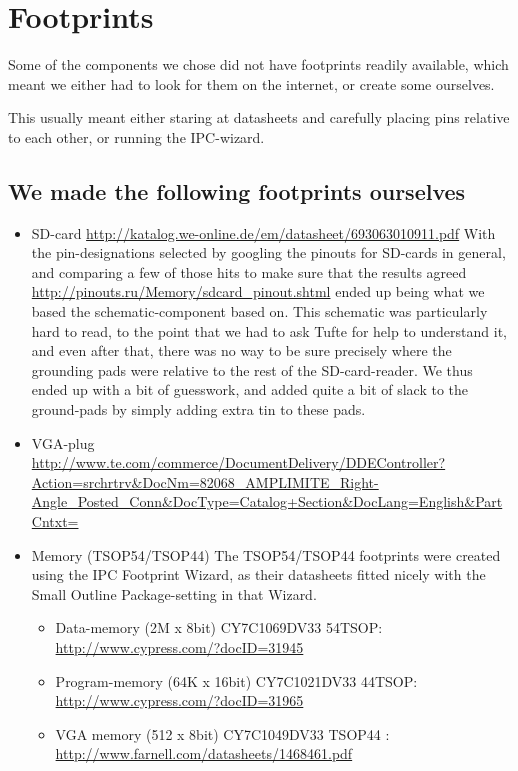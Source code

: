 \section {Footprints}
Some of the components we chose did not have footprints readily available, which
meant we either had to look for them on the internet, or create some ourselves.

This usually meant either staring at datasheets and carefully placing pins
relative to each other, or running the IPC-wizard.

\subsection {We made the following footprints ourselves}
\begin {itemize}
\item SD-card \url{http://katalog.we-online.de/em/datasheet/693063010911.pdf}
  With the pin-designations selected by googling the pinouts for SD-cards in
  general, and comparing a few of those hits to make sure that the results
  agreed \url{http://pinouts.ru/Memory/sdcard_pinout.shtml} ended up being what
  we based the schematic-component based on. This schematic was particularly hard
  to read, to the point that we had to ask Tufte for help to understand it, and even
  after that, there was no way to be sure precisely where the grounding pads were relative
  to the rest of the SD-card-reader. We thus ended up with a bit of guesswork, and added
  quite a bit of slack to the ground-pads by simply adding extra tin to these pads.
\item VGA-plug \url{http://www.te.com/commerce/DocumentDelivery/DDEController?Action=srchrtrv&DocNm=82068_AMPLIMITE_Right-Angle_Posted_Conn&DocType=Catalog+Section&DocLang=English&PartCntxt=}
\item Memory (TSOP54/TSOP44)
The TSOP54/TSOP44 footprints were created using the IPC Footprint Wizard, as
their datasheets fitted nicely with the Small Outline Package-setting in that
Wizard.

\begin {itemize}
\item Data-memory (2M x 8bit) CY7C1069DV33 54TSOP:
\url{http://www.cypress.com/?docID=31945} 
\item Program-memory (64K x 16bit)
CY7C1021DV33 44TSOP: \url{http://www.cypress.com/?docID=31965} 
\item VGA memory (512 x 8bit) CY7C1049DV33 TSOP44 : \url{http://www.farnell.com/datasheets/1468461.pdf}
\end {itemize}
\end {itemize}

